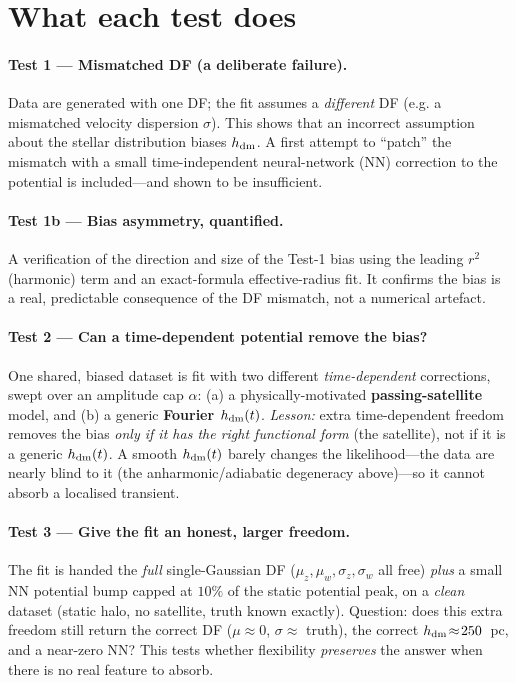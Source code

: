 \documentclass[11pt]{article}
\newcommand{\hdm}{h_{\rm dm}}
\begin{document}
\section{What each test does}

\paragraph{Test 1 --- Mismatched DF (a deliberate failure).}
Data are generated with one DF; the fit assumes a \emph{different} DF (e.g. a
mismatched velocity dispersion $\sigma$). This shows that an incorrect assumption
about the stellar distribution biases $\hdm$. A first attempt to ``patch'' the
mismatch with a small time-independent neural-network (NN) correction to the
potential is included---and shown to be insufficient.

\paragraph{Test 1b --- Bias asymmetry, quantified.}
A verification of the direction and size of the Test-1 bias using the leading
$r^2$ (harmonic) term and an exact-formula effective-radius fit. It confirms the
bias is a real, predictable consequence of the DF mismatch, not a numerical
artefact.

\paragraph{Test 2 --- Can a time-dependent potential remove the bias?}
One shared, biased dataset is fit with two different \emph{time-dependent}
corrections, swept over an amplitude cap $\alpha$: (a) a physically-motivated
\textbf{passing-satellite} model, and (b) a generic \textbf{Fourier $\hdm(t)$}.
\emph{Lesson:} extra time-dependent freedom removes the bias \emph{only if it has
the right functional form} (the satellite), not if it is a generic $\hdm(t)$. A
smooth $\hdm(t)$ barely changes the likelihood---the data are nearly blind to it
(the anharmonic/adiabatic degeneracy above)---so it cannot absorb a localised
transient.

\paragraph{Test 3 --- Give the fit an honest, larger freedom.}
The fit is handed the \emph{full} single-Gaussian DF ($\mu_z,\mu_w,\sigma_z,
\sigma_w$ all free) \emph{plus} a small NN potential bump capped at $10\%$ of the
static potential peak, on a \emph{clean} dataset (static halo, no satellite, truth
known exactly). Question: does this extra freedom still return the correct DF
($\mu\!\approx\!0$, $\sigma\!\approx\!$ truth), the correct $\hdm\!\approx\!250$~pc,
and a near-zero NN? This tests whether flexibility \emph{preserves} the answer
when there is no real feature to absorb.
\end{document}
